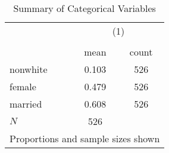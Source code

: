 \begin{table}[htbp]\centering
\def\sym#1{\ifmmode^{#1}\else\(^{#1}\)\fi}
\caption{Summary of Categorical Variables}
\begin{tabular}{l*{1}{cc}}
\toprule
            &\multicolumn{2}{c}{(1)}  \\
            &\multicolumn{2}{c}{}     \\
            &        mean&       count\\
\midrule
nonwhite    &       0.103&         526\\
female      &       0.479&         526\\
married     &       0.608&         526\\
\midrule
\(N\)       &         526&            \\
\bottomrule
\multicolumn{3}{l}{\footnotesize Proportions and sample sizes shown}\\
\end{tabular}
\end{table}
